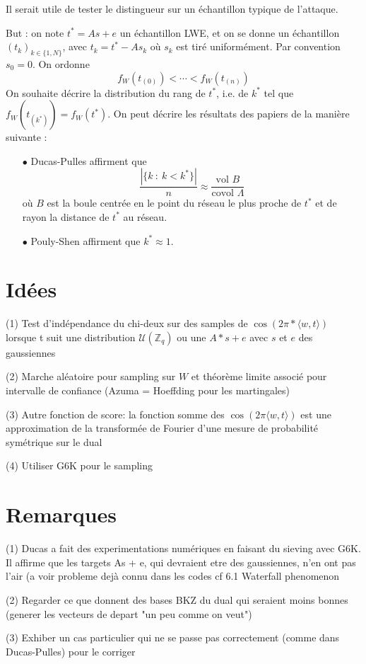 \documentclass{article}
\begin{document}
Il serait utile de tester le distingueur sur un échantillon typique de l'attaque. 

But : on note $t^* = As+e$ un échantillon LWE, et on se donne un échantillon $(t_k)_{k\in\{1,N\}}$, avec $t_k = t^* - A s_k$ où $s_k$ est tiré uniformément. Par convention $s_0=0$. On ordonne 
\[ f_W(t_{(0)})<\cdots < f_W(t_{(n)}) \]
On souhaite décrire la distribution du rang de $t^*$, i.e. de $k^*$ tel que $f_W(t_{(k^*)}) = f_W(t^*)$.
On peut décrire les résultats des papiers de la manière suivante :
\begin{itemize}
\item[$\bullet$] Ducas-Pulles affirment que 
\[\frac{|\{k \ : \ k < k^* \}|}{n} \approx \frac{\text{vol }B}{\text{covol }\Lambda}\]
où $B$ est la boule centrée en le point du réseau le plus proche de $t^*$ et de rayon la distance de $t^*$ au réseau.
\item[$\bullet$] Pouly-Shen affirment que $k^*\approx 1$.
\end{itemize}
\section{Idées}

(1) Test d'indépendance du chi-deux sur des samples de $\cos(2  \pi * \langle w , t \rangle)$ lorsque t suit une distribution $\mathcal U(\mathbb Z_q)$ ou une $A * s + e$ avec $s$ et $e$ des gaussiennes 
 
(2) Marche aléatoire pour sampling sur $W$ et théorème limite associé pour intervalle de confiance (Azuma = Hoeffding pour les martingales) 
 
(3) Autre fonction de score: la fonction somme des $\cos(2 \pi \langle w,t\rangle )$ est une approximation de la transformée de Fourier d'une mesure de probabilité symétrique sur le dual

(4) Utiliser G6K pour le sampling

\section{Remarques}   

(1) Ducas a fait des experimentations numériques en faisant du sieving avec G6K. Il affirme que les targets As + e, qui devraient etre des gaussiennes, n'en ont pas l'air (a voir probleme dejà connu dans les codes cf 6.1 Waterfall phenomenon

(2) Regarder ce que donnent des bases BKZ du dual qui seraient moins bonnes (generer les vecteurs de depart "un peu comme on veut")

(3) Exhiber un cas particulier qui ne se passe pas correctement (comme dans Ducas-Pulles) pour le corriger



\end{document}
